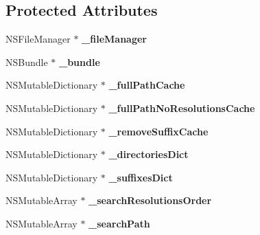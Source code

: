 \subsection*{Protected Attributes}
\begin{DoxyCompactItemize}
\item 
\hypertarget{class_c_c_file_utils_a332288eb5dd424672addaab80923d36f}{N\-S\-File\-Manager $\ast$ {\bfseries \-\_\-file\-Manager}}\label{class_c_c_file_utils_a332288eb5dd424672addaab80923d36f}

\item 
\hypertarget{class_c_c_file_utils_ad43765973ba9c8fec237e39c90b1ec93}{N\-S\-Bundle $\ast$ {\bfseries \-\_\-bundle}}\label{class_c_c_file_utils_ad43765973ba9c8fec237e39c90b1ec93}

\item 
\hypertarget{class_c_c_file_utils_aafe99e280e98c203abc28a4de0d88e97}{N\-S\-Mutable\-Dictionary $\ast$ {\bfseries \-\_\-full\-Path\-Cache}}\label{class_c_c_file_utils_aafe99e280e98c203abc28a4de0d88e97}

\item 
\hypertarget{class_c_c_file_utils_a8e5f150850d5ef6c003cedd1bd457c22}{N\-S\-Mutable\-Dictionary $\ast$ {\bfseries \-\_\-full\-Path\-No\-Resolutions\-Cache}}\label{class_c_c_file_utils_a8e5f150850d5ef6c003cedd1bd457c22}

\item 
\hypertarget{class_c_c_file_utils_a83e2e314d38f6d5bc94330389f8b6431}{N\-S\-Mutable\-Dictionary $\ast$ {\bfseries \-\_\-remove\-Suffix\-Cache}}\label{class_c_c_file_utils_a83e2e314d38f6d5bc94330389f8b6431}

\item 
\hypertarget{class_c_c_file_utils_a41040a83d948df24550691802e92b484}{N\-S\-Mutable\-Dictionary $\ast$ {\bfseries \-\_\-directories\-Dict}}\label{class_c_c_file_utils_a41040a83d948df24550691802e92b484}

\item 
\hypertarget{class_c_c_file_utils_a7e6bf1781117dc2d568c5674ffb36d9a}{N\-S\-Mutable\-Dictionary $\ast$ {\bfseries \-\_\-suffixes\-Dict}}\label{class_c_c_file_utils_a7e6bf1781117dc2d568c5674ffb36d9a}

\item 
\hypertarget{class_c_c_file_utils_a8dab1c5c20b87ac9d5bf2796843abd9a}{N\-S\-Mutable\-Array $\ast$ {\bfseries \-\_\-search\-Resolutions\-Order}}\label{class_c_c_file_utils_a8dab1c5c20b87ac9d5bf2796843abd9a}

\item 
\hypertarget{class_c_c_file_utils_a3c26389a02b3059b9a48f195a68211d2}{N\-S\-Mutable\-Array $\ast$ {\bfseries \-\_\-search\-Path}}\label{class_c_c_file_utils_a3c26389a02b3059b9a48f195a68211d2}


\end{DoxyCompactItemize}
